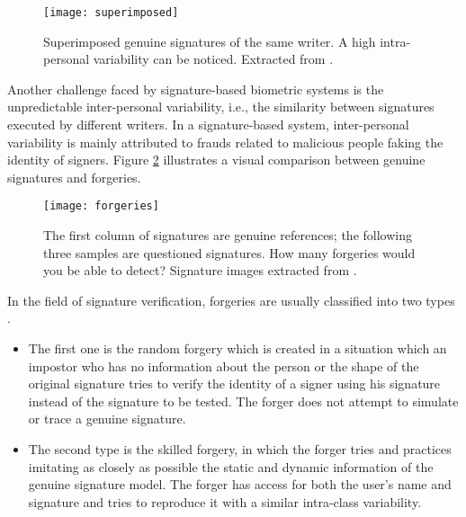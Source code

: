 \begin{figure}[!h]
\centering
\texttt{[image: superimposed]}
\caption{Superimposed genuine signatures of the same writer. A high intra-personal variability can be noticed. Extracted from \cite{hafemann2015offline}. }
\label{fig:intraclass}
\end{figure}


Another challenge faced by signature-based biometric systems is the unpredictable inter-personal variability, i.e., the similarity between signatures executed by different writers. In a signature-based system, inter-personal variability is mainly attributed to frauds related to malicious people faking the identity of signers. Figure \ref{fig_forgeries} illustrates a visual comparison between genuine signatures and forgeries. 

\begin{figure}[!htb]
\centering
\texttt{[image: forgeries]}
\caption[The first column of signatures are genuine references, the following three samples are questioned signatures. How many forgeries would you be able to detect? Signature images extracted from \cite{mcyt-100}.]{The first column of signatures are genuine references; the following three samples are questioned signatures. How many forgeries would you be able to detect? \protect\footnotemark Signature images extracted from \cite{mcyt-100}.} 
\label{fig_forgeries}

\end{figure}


In the field of signature verification, forgeries are usually classified into two types \cite{impedovo2008state}. 
\begin{itemize}
\item The first one is the random forgery which is created in a situation which an impostor who has no information about the person or the shape of the original signature tries to verify the identity of a signer using his signature instead of the signature to be tested. The forger does not attempt to simulate or trace a genuine signature.

\item The second type is the skilled forgery, in which the forger tries and practices imitating as closely as possible the static and dynamic information of the genuine signature model. The forger has access for both the user’s name and signature and tries to reproduce it with a similar intra-class variability.
\end{itemize}



